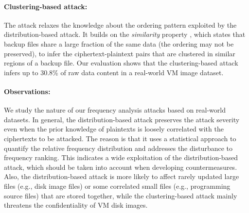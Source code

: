 \documentclass[bachelor]{thesis-uestc}
\begin{document}



\paragraph{Clustering-based attack:}  The attack relaxes the knowledge about
the ordering pattern exploited by the distribution-based attack.  It builds on
the {\em similarity} property \cite{xia11,bhagwat09}, which states that backup
files share a large fraction of the same data (the ordering may not be
preserved), to infer the ciphertext-plaintext pairs that are clustered
in similar regions of a backup file.  Our evaluation shows that the
clustering-based attack infers up to 30.8\% of raw data content in a
real-world VM image dataset.


\paragraph{Observations:}  We study the nature of our frequency analysis
attacks based on real-world datasets.  In general, the distribution-based
attack preserves the attack severity even when the prior knowledge of
plaintexts is loosely correlated with the ciphertexts to be attacked.  The
reason is that it uses a statistical approach to quantify the relative
frequency distribution and addresses the disturbance to frequency ranking.  This indicates a wide
exploitation of the distribution-based attack, which should be taken into
account when developing countermeasures.   Also, the distribution-based attack
is more likely to affect rarely updated large files (e.g., disk image files)
or some correlated small files (e.g., programming source files) that are stored together, while the clustering-based
attack mainly threatens the confidentiality of VM disk images.    
\end{document}
